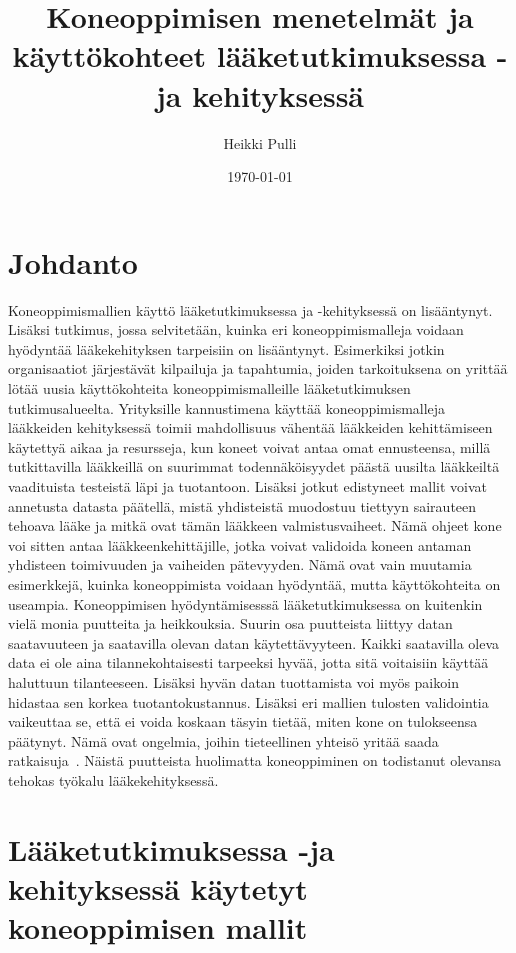 \documentclass[finnish,twoside,censored,essay,sw-line]{HYthesisML}
\title{Koneoppimisen menetelmät ja käyttökohteet lääketutkimuksessa -ja kehityksessä}
\author{Heikki Pulli}
\date{\today}
\begin{document}
\maketitle

\mytableofcontents
\mainmatter

\chapter{Johdanto}

Koneoppimismallien käyttö lääketutkimuksessa ja -kehityksessä on lisääntynyt. Lisäksi tutkimus, jossa selvitetään,
kuinka eri koneoppimismalleja voidaan hyödyntää lääkekehityksen tarpeisiin on lisääntynyt. Esimerkiksi jotkin organisaatiot järjestävät
kilpailuja ja tapahtumia, joiden tarkoituksena on yrittää lötää uusia käyttökohteita koneoppimismalleille lääketutkimuksen
tutkimusalueelta. Yrityksille kannustimena käyttää koneoppimismalleja lääkkeiden kehityksessä toimii mahdollisuus vähentää
lääkkeiden kehittämiseen käytettyä aikaa ja resursseja, kun koneet voivat antaa omat ennusteensa, millä tutkittavilla lääkkeillä on suurimmat todennäköisyydet
päästä uusilta lääkkeiltä vaadituista testeistä läpi ja tuotantoon. Lisäksi jotkut edistyneet mallit voivat annetusta datasta päätellä,
mistä yhdisteistä muodostuu tiettyyn sairauteen tehoava lääke ja mitkä ovat tämän lääkkeen valmistusvaiheet. Nämä ohjeet kone voi
sitten antaa lääkkeenkehittäjille, jotka voivat validoida koneen antaman yhdisteen toimivuuden ja vaiheiden pätevyyden. Nämä
ovat vain muutamia esimerkkejä, kuinka koneoppimista voidaan hyödyntää, mutta käyttökohteita on useampia. Koneoppimisen hyödyntämisesssä lääketutkimuksessa
on kuitenkin vielä monia puutteita ja heikkouksia. Suurin osa  puutteista liittyy datan saatavuuteen ja saatavilla olevan datan
käytettävyyteen. Kaikki saatavilla oleva data ei ole aina tilannekohtaisesti tarpeeksi hyvää, jotta sitä voitaisiin käyttää
haluttuun tilanteeseen. Lisäksi hyvän datan tuottamista voi myös paikoin hidastaa sen korkea tuotantokustannus. Lisäksi eri mallien tulosten
validointia vaikeuttaa se, että ei voida koskaan täsyin tietää, miten kone on tulokseensa päätynyt. Nämä ovat ongelmia,
joihin tieteellinen yhteisö yritää saada ratkaisuja~\cite{VamathevanJessica2019Aoml}. Näistä puutteista huolimatta koneoppiminen
on todistanut olevansa tehokas työkalu lääkekehityksessä.

\chapter{Lääketutkimuksessa -ja kehityksessä käytetyt koneoppimisen mallit}
\end{document}
